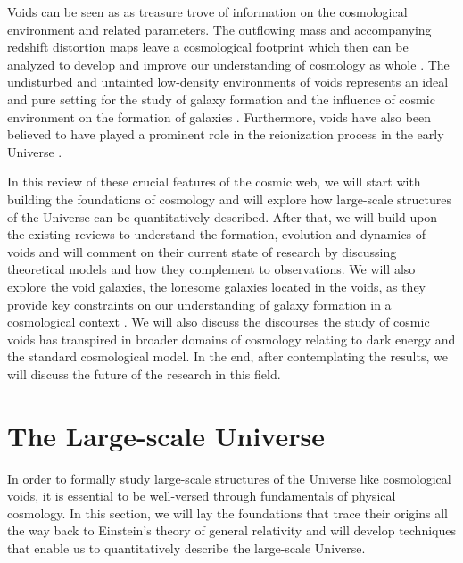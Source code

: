 \documentclass[fleqn,usenatbib]{mnras}
\begin{document}
Voids can be seen as as treasure trove of information on the cosmological environment and related parameters. The outflowing mass and accompanying redshift distortion maps leave a cosmological footprint which then can be analyzed to develop and improve our understanding of cosmology as whole \citep{martel_simulation_1990, dekel_omega_1994, ryden_voids_1996}. The undisturbed and untainted low-density environments of voids represents an ideal and pure setting for the study of galaxy formation and the influence of cosmic environment on the formation of galaxies \citep{kreckel_only_2011, kreckel_void_2012}. Furthermore, voids have also been believed to have played a prominent role in the reionization process in the early Universe \citep{furlanetto_cosmology_2006, morales_reionization_2010}.

In this review of these crucial features of the cosmic web, we will start with building the foundations of cosmology and will explore how large-scale structures of the Universe can be quantitatively described. After that, we will build upon the existing reviews \citep{van_de_weygaert_cosmic_2011, van_de_weygaert_voids_2014} to understand the formation, evolution and dynamics of voids and will comment on their current state of research by discussing theoretical models and how they complement to observations. We will also explore the void galaxies, the lonesome galaxies located in the voids, as they provide key constraints on our understanding of galaxy formation in a cosmological context \citep{kreckel_void_2014}. We will also discuss the discourses the study of cosmic voids has transpired in broader domains of cosmology relating to dark energy and the standard cosmological model. In the end, after contemplating the results, we will discuss the future of the research in this field.
%

\section{The Large-scale Universe}
In order to formally study large-scale structures of the Universe like cosmological voids, it is essential to be well-versed through fundamentals of physical cosmology. In this section, we will lay the foundations that trace their origins all the way back to Einstein's theory of general relativity and will develop techniques that enable us to quantitatively describe the large-scale Universe. 
\end{document}
